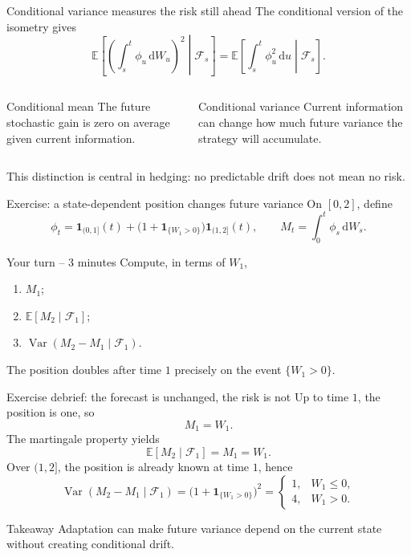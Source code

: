 \documentclass[handout,10pt,aspectratio=169]{beamer}
\newcommand{\E}{\mathbb E}
\newcommand{\F}{\mathcal F}
\newcommand{\dd}{\,\mathrm d}
\DeclareMathOperator{\Var}{Var}
\begin{document}
\begin{frame}{Conditional variance measures the risk still ahead}
The conditional version of the isometry gives
\[
\boxed{
\E\left[
\left(\int_s^t\phi_u\dd W_u\right)^2
\middle|\F_s\right]
=\E\left[\int_s^t\phi_u^2\dd u\middle|\F_s\right].}
\]
\begin{columns}[T,onlytextwidth]
\begin{block}{Conditional mean}
The future stochastic gain is zero on average given current information.
\end{block}
\begin{block}{Conditional variance}
Current information can change how much future variance the strategy will accumulate.
\end{block}
\end{columns}
This distinction is central in hedging: no predictable drift does not mean no risk.
\end{frame}

\begin{frame}{Exercise: a state-dependent position changes future variance}
On \([0,2]\), define
\[
\phi_t=\mathbf 1_{(0,1]}(t)
+\bigl(1+\mathbf 1_{\{W_1>0\}}\bigr)\mathbf 1_{(1,2]}(t),
\qquad
M_t=\int_0^t\phi_s\dd W_s.
\]
\begin{block}{Your turn -- 3 minutes}
Compute, in terms of \(W_1\),
\begin{enumerate}\setlength{\itemsep}{0.5em}
  \item \(M_1\);
  \item \(\E[M_2\mid\F_1]\);
  \item \(\Var(M_2-M_1\mid\F_1)\).
\end{enumerate}
\end{block}
The position doubles after time \(1\) precisely on the event \(\{W_1>0\}\).
\end{frame}

\begin{frame}{Exercise debrief: the forecast is unchanged, the risk is not}
Up to time \(1\), the position is one, so
\[
M_1=W_1.
\]
The martingale property yields
\[
\E[M_2\mid\F_1]=M_1=W_1.
\]
Over \((1,2]\), the position is already known at time \(1\), hence
\[
\Var(M_2-M_1\mid\F_1)
=\bigl(1+\mathbf 1_{\{W_1>0\}}\bigr)^2
=\begin{cases}
1,&W_1\le0,\\
4,&W_1>0.
\end{cases}
\]
\begin{block}{Takeaway}
Adaptation can make future variance depend on the current state without creating conditional drift.
\end{block}
\end{frame}
\end{document}

